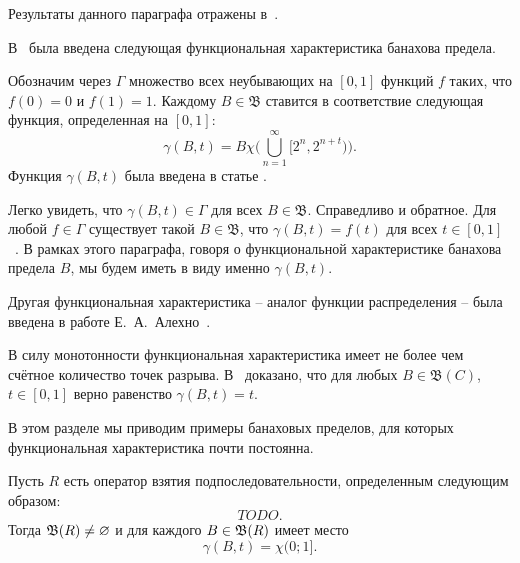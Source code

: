 Результаты данного параграфа отражены в~\cite{avdeev2024set_DAN_rus}.


В~\cite{semenov2019mainclasses_rus} была введена следующая функциональная характеристика банахова предела.

Обозначим через $\Gamma$ множество всех неубывающих на $[0, 1]$ функций $f$ таких,
что $f(0) = 0$ и $f(1) = 1$. Каждому $B \in \mathfrak B$
ставится в соответствие следующая функция, определенная на $[0, 1]$:
$$
        \gamma(B, t) = B \chi\Bigg(\bigcup^\infty_{n = 1} [2^n, 2^{n + t})\Bigg)
        .
$$
Функция $\gamma(B,t)$ была введена в статье \cite{semenov2019mainclasses_rus}.

Легко увидеть, что $\gamma (B, t) \in \Gamma$ для всех $B \in \mathfrak B$.
Справедливо и обратное. Для любой $f \in \Gamma$ существует такой
$B \in \mathfrak B$, что $\gamma(B, t) = f(t)$ для всех
$t \in [0, 1]$~\cite[Предложение 2]{semenov2019mainclasses_rus}.
В рамках этого параграфа, говоря о функциональной характеристике банахова предела $B$,
мы будем иметь в виду именно $\gamma(B,t)$.

Другая функциональная характеристика -- аналог функции распределения -- была введена в работе Е.~А.~Алехно~\cite{Alekhno2:TODO}.

В силу монотонности функциональная характеристика имеет не более чем счётное количество точек разрыва.
В~\cite[Теорема 23]{semenov2019mainclasses_rus} доказано, что
для любых $B \in \mathfrak B(C)$, $t \in [0, 1]$ верно равенство $\gamma (B, t) = t$.

В этом разделе мы приводим примеры банаховых пределов, для которых функциональная характеристика почти постоянна.

\begin{lemma}
    Пусть $R$ есть оператор взятия подпоследовательности, определенным следующим образом:
    \begin{equation}
		TODO
		.
    \end{equation}
    Тогда $\mathfrak{B}(R) \ne\varnothing$ и для каждого $B\in \mathfrak{B}(R)$ имеет место
    \begin{equation}
        \gamma(B, t) = \chi(0;1]
        .
    \end{equation}
\end{lemma}


